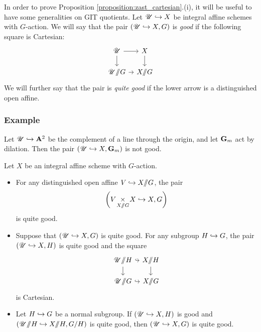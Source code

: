 \subsubsection{} In order to prove Proposition \ref{proposition:zast_cartesian}.(i), it will be useful to have some generalities on GIT quotients. Let $\mathscr{U} \hookrightarrow X$ be integral affine schemes with $G$-action. We will say that the pair $(\mathscr{U} \hookrightarrow X, G)$ is \emph{good} if the following square is Cartesian:
  \[
  \begin{tikzcd}[
  column sep={4em,between origins},
  row sep={3em,between origins}
]
    \UU \arrow[r] \arrow[d] & X \arrow[d] \\
    \UU\git G \arrow[r] & X \git G
  \end{tikzcd}
  \]
We will further say that the pair is \emph{quite good} if the lower arrow is a distinguished open affine.

\subsubsection{Example} Let $\mathscr{U} \hookrightarrow \mathbf{A}^2$ be the complement of a line through the origin, and let $\mathbf{G}_m$ act by dilation. Then the pair $(\mathscr{U} \hookrightarrow X, \mathbf{G}_m)$ is not good.

\begin{proposition}
\label{proposition:git_qgood}
Let $X$ be an integral affine scheme with $G$-action.
\begin{itemize}
    \item[(i)] For any distinguished open affine $V \hookrightarrow X / \!\! / G$, the pair
      \[\left( V \! \underset{X / \!\! / G}{\times} \! X \hookrightarrow X, G \right)\]
    is quite good.
    \item[(ii)] Suppose that $(\mathscr{U} \hookrightarrow X, G)$ is quite good. For any subgroup $H \hookrightarrow G$, the pair $(\mathscr{U} \hookrightarrow X, H)$ is quite good and the square
      \[
      \begin{tikzcd}[
  column sep={4em,between origins},
  row sep={3em,between origins}
]
        \UU \git H \arrow[r, hook] \arrow[d] & X \git H \arrow[d] \\
        \UU \git G \arrow[r, hook] & X \git G
      \end{tikzcd}
      \]
    is Cartesian.
    \item[(iii)] Let $H \hookrightarrow G$ be a normal subgroup. If $(\mathscr{U} \hookrightarrow X, H)$ is good and $(\mathscr{U} / \!\! / H \hookrightarrow X / \!\! / H, G/H)$ is quite good, then $(\mathscr{U} \hookrightarrow X, G)$ is quite good.
\end{itemize}
\end{proposition}

